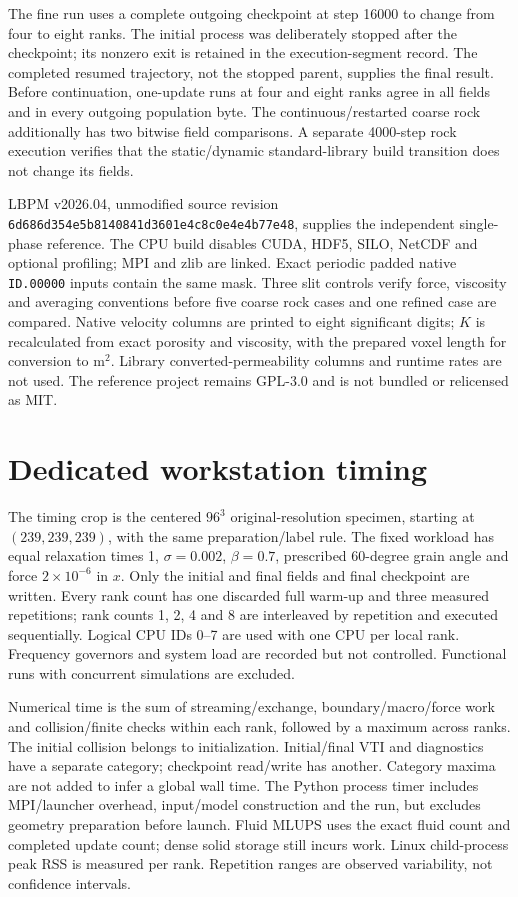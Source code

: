 \documentclass[11pt]{article}
\begin{document}
The fine run uses a complete outgoing checkpoint at step 16000 to change
from four to eight ranks. The initial process was deliberately stopped after
the checkpoint; its nonzero exit is retained in the execution-segment record.
The completed resumed trajectory, not the stopped parent, supplies the final
result. Before continuation, one-update runs at four and eight ranks agree
in all fields and in every outgoing population byte. The continuous/restarted
coarse rock additionally has two bitwise field comparisons. A separate
4000-step rock execution verifies that the static/dynamic standard-library
build transition does not change its fields.

LBPM v2026.04, unmodified source revision
\texttt{6d686d354e5b8140841d3601e4c8c0e4e4b77e48}, supplies the independent
single-phase reference. The CPU build disables CUDA, HDF5, SILO, NetCDF and
optional profiling; MPI and zlib are linked. Exact periodic padded native
\texttt{ID.00000} inputs contain the same mask. Three slit controls verify
force, viscosity and averaging conventions before five coarse rock cases
and one refined case are compared. Native velocity columns are printed to
eight significant digits; $K$ is recalculated from exact porosity and viscosity,
with the prepared voxel length for conversion to $\mathrm{m}^2$. Library
converted-permeability columns and runtime rates are not used.
The reference project remains GPL-3.0 and is not bundled or relicensed as MIT.

\section{Dedicated workstation timing}
The timing crop is the centered $96^3$ original-resolution specimen,
starting at $(239,239,239)$, with the same preparation/label rule. The fixed
workload has equal relaxation times 1, $\sigma=0.002$, $\beta=0.7$,
prescribed 60-degree grain angle and force $2\times10^{-6}$ in $x$.
Only the initial and final fields and final checkpoint are written.
Every rank count has one discarded full warm-up and three measured
repetitions; rank counts 1, 2, 4 and 8 are interleaved by repetition and
executed sequentially. Logical CPU IDs 0--7 are used with one CPU per local
rank. Frequency governors and system load are recorded but not controlled.
Functional runs with concurrent simulations are excluded.

Numerical time is the sum of streaming/exchange, boundary/macro/force work
and collision/finite checks within each rank, followed by a maximum across
ranks. The initial collision belongs to initialization. Initial/final VTI
and diagnostics have a separate category; checkpoint read/write has another.
Category maxima are not added to infer a global wall time. The Python
process timer includes MPI/launcher overhead, input/model construction and
the run, but excludes geometry preparation before launch. Fluid MLUPS uses
the exact fluid count and completed update count; dense solid storage still
incurs work. Linux child-process peak RSS is measured per rank. Repetition
ranges are observed variability, not confidence intervals.
\end{document}
